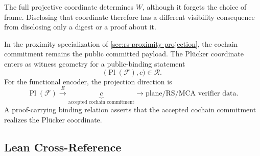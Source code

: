 The full projective coordinate determines \(W\), although it forgets the
choice of frame. Disclosing that coordinate therefore has a different
visibility consequence from disclosing only a digest or a proof about it.

In the proximity specialization of \cref{sec:rs-proximity-projection}, the cochain
commitment remains the public committed payload. The Pl\"ucker coordinate enters
as witness geometry for a public-binding statement
\[
  \bigl(\operatorname{Pl}(\mathcal F),c\bigr)\in\mathcal R.
\]
For the functional encoder, the projection direction is
\[
  \operatorname{Pl}(\mathcal F)
  \xrightarrow{\ E\ }
  \underbrace{c}_{\text{accepted cochain commitment}}
  \longrightarrow
  \text{plane/RS/MCA verifier data}.
\]
A proof-carrying binding relation asserts that the accepted cochain commitment
realizes the Pl\"ucker coordinate.

\subsection*{Lean Cross-Reference}

